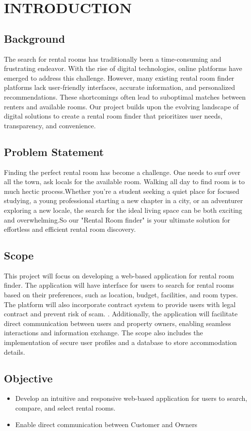 \section{INTRODUCTION}
\subsection{Background}
The search for rental rooms has traditionally been a time-consuming and frustrating endeavor. With the rise of digital technologies, online platforms have emerged to address this challenge. However, many existing rental room finder platforms lack user-friendly interfaces, accurate information, and personalized recommendations. These shortcomings often lead to suboptimal matches between renters and available rooms. Our project builds upon the evolving landscape of digital solutions to create a rental room finder that prioritizes user needs, transparency, and convenience.

\subsection{Problem Statement}
Finding the perfect rental room has become a challenge. One needs to surf over all the town, ask locals for the available room. Walking all day to find room is to much hectic process.Whether you're a student seeking a quiet place for focused studying, a young professional starting a new chapter in a  city, or an adventurer exploring a new locale, the search for the ideal living space can be both exciting and overwhelming.So our "Rental Room finder" is your ultimate solution for effortless and efficient rental room discovery.



\subsection{Scope}
This project will focus on developing a web-based application for rental room finder. The application will have interface for users to search for rental rooms based on their preferences, such as location, budget, facilities, and room types. The platform will also incorporate contract system to provide users with legal contract and prevent  risk of scam. . Additionally, the application will facilitate direct communication between users and property owners, enabling seamless interactions and information exchange. The scope also includes the implementation of secure user profiles and a database to store accommodation details.\\


\subsection{Objective}

\begin{itemize}
    \item Develop an intuitive and responsive web-based application for users to search, compare, and select rental rooms.
    \item Enable direct communication between Customer and Owners 
    

  
\end{itemize}
